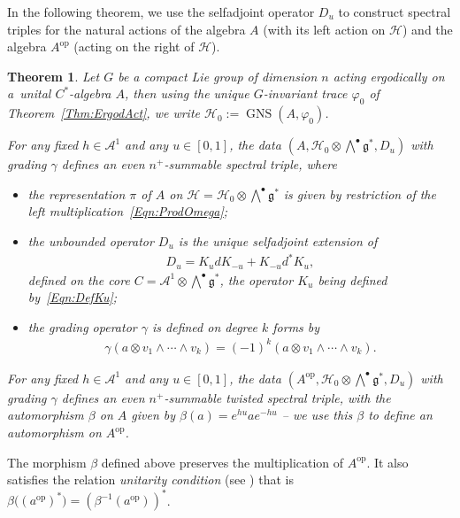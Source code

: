 \documentclass[pdftex]{sigma}
\newtheorem{Theorem}{Theorem}[section]
\newcommand{\Aa}{\mathcal{A}}
\newcommand{\Core}{C}
\newcommand{\Hh}{\mathscr{H}}
\newcommand{\LieG}{\mathfrak{g}}
\DeclareMathOperator{\GNS}{GNS}
\numberwithin{equation}{section}
\begin{document}
In the following theorem, we use the selfadjoint operator $D_u$ to construct spectral triples for the natural actions of the algebra $A$ (with its left action on $\Hh$) and the algebra $A^\text{op}$ (acting on the right of $\Hh$).
\begin{Theorem}
\label{Thm:Main}
Let $G$ be a \emph{compact} Lie group of dimension $n$ acting ergodically on a~unital $C^*$-algebra $A$, then using the unique $G$-invariant trace $\varphi_0$ of Theorem~{\rm \ref{Thm:ErgodAct}}, we write $\Hh_0 := \GNS(A, \varphi_0)$.

For any fixed $h \in \Aa^1$ and any $u \in [0,1]$, the data $(A, \Hh_0 \otimes \bigwedge^\bullet \LieG^*, D_u)$ with grading $\gamma$ defines an even $n^+$-summable spectral triple, where
\begin{itemize}\itemsep=0pt
\item
the representation $\pi$ of $A$ on $\Hh = \Hh_0 \otimes \bigwedge^\bullet \LieG^*$ is given by restriction of the left multiplication~\eqref{Eqn:ProdOmega};
\item
the unbounded operator $D_u$ is the unique selfadjoint extension of
\begin{gather*}
D_{u} = K_{u} d K_{-u} + K_{-u} d^* K_{u},
\end{gather*}
defined on the core $\Core = \Aa^1 \otimes \bigwedge^\bullet \LieG^*$, the operator $K_u$ being defined by~\eqref{Eqn:DefKu};
\item
the grading operator $\gamma$ is defined on degree $k$ forms by
\begin{gather*}
\gamma( a \otimes v_1 \wedge \cdots \wedge v_k) = (-1)^k ( a \otimes v_1 \wedge \cdots \wedge v_k).
\end{gather*}
\end{itemize}
For any fixed $h \in \Aa^1$ and any $u \in [0,1]$, the data $(A^\text{op}, \Hh_0 \otimes \bigwedge^\bullet \LieG^*, D_u)$ with grading $\gamma$ defines an even $n^+$-summable \emph{twisted} spectral triple, with the automorphism $\beta$ on $A$ given by $\beta(a) = e^{h u} a e^{-h u}$ -- we use this $\beta$ to define an automorphism on $A^\text{op}$.
\end{Theorem}

\begin{Remark}
The morphism $\beta$ def\/ined above preserves the multiplication of $A^\text{op}$. It also satisf\/ies the relation \emph{unitarity condition} (see \cite[equation~(3.4)]{TrSpTypeIII}) that is $\beta\big( (a^\text{op})^* \big) = (\beta^{-1}(a^\text{op}))^*$.
\end{Remark}
\end{document}
